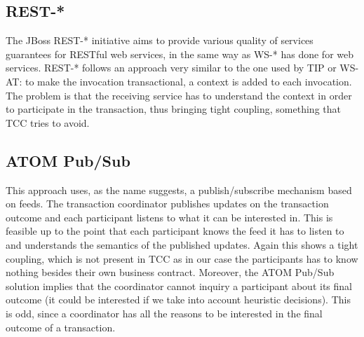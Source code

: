 \subsection{ REST-*}
The JBoss REST-* initiative aims to provide various quality of services guarantees for RESTful web services, in the same way as WS-* has done for web services. REST-* follows an approach very similar to the one used by TIP or WS-AT: to make the invocation transactional, a context is added to each invocation. The problem is that the receiving service has to understand the context in order to participate in the transaction, thus bringing tight coupling, something that TCC tries to avoid.

\subsection{ATOM Pub/Sub}
This approach uses, as the name suggests, a publish/subscribe mechanism based on feeds. The transaction coordinator publishes updates on the transaction outcome and each participant listens to what it can be interested in. This is feasible up to the point that each participant knows the feed it has to listen to and understands the semantics of the published updates. Again this shows a tight coupling, which is not present in TCC as in our case the participants has to know nothing besides their own business contract. Moreover, the ATOM Pub/Sub solution implies that the coordinator cannot inquiry a participant about its final outcome (it could be interested if we take into account heuristic decisions). This is odd, since a coordinator has all the reasons to be interested in the final outcome of a transaction.

